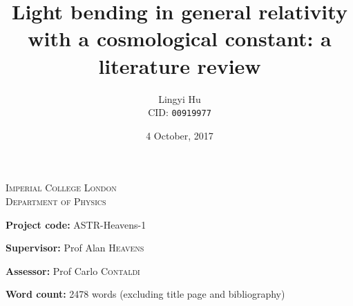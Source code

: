 



\begin{titlepage}
  \center

  \vspace*{2cm}
  \textsc{\Large Imperial College London}\\[0.5cm] 
  \textsc{\large Department of Physics}\\[0.5cm] 

  \title{\bf{Light bending in general relativity with a cosmological constant: a literature review}}
  \date{4 October, 2017}
  \author{Lingyi Hu\\ CID: \texttt{00919977}}

  {\let\newpage\relax\maketitle}
  \thispagestyle{empty}

  \vspace*{1cm}
  \noindent
  \large
  {\bf Project code:} ASTR-Heavens-1\par
  {\bf Supervisor:} Prof Alan \textsc{Heavens}\par
  {\bf Assessor:} Prof Carlo \textsc{Contaldi}

  \vspace*{1cm}

  {\bf Word count:}
  2478 words (excluding title page and bibliography)

  \vspace*{2cm}


\end{titlepage}

\tableofcontents

\vspace*{2cm}
\noindent










\newpage
\noindent
\vspace*{2cm}
\printbibliography[heading=bibintoc, title={References}]


